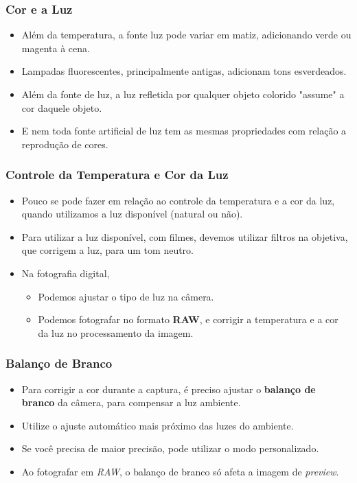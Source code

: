 
\begin{frame}
    \frametitle{Cor e a Luz}
    \begin{itemize}
      \item Além da temperatura, a fonte luz pode variar em matiz, adicionando verde ou magenta
      à cena.
      \item Lampadas fluorescentes, principalmente antigas, adicionam tons esverdeados.
      \item Além da fonte de luz, a luz refletida por qualquer objeto colorido "assume" a cor
      daquele objeto.
      \item E nem toda fonte artificial de luz tem as mesmas propriedades com relação a
      reprodução de cores.
    \end{itemize}
\end{frame}


\begin{frame}
    \frametitle{\Large{Controle da Temperatura e Cor da Luz}}
    \begin{itemize}
      \item Pouco se pode fazer em relação ao controle da temperatura e a cor da luz,
      quando utilizamos a luz disponível (natural ou não).
      \item Para utilizar a luz disponível, com filmes, devemos utilizar filtros
      na objetiva, que corrigem a luz, para um tom neutro.
      \item Na fotografia digital,
        \begin{itemize}
          \item Podemos ajustar o tipo de luz na câmera.
          \item Podemos fotografar no formato \textbf{RAW}, e
          corrigir a temperatura e a cor da luz no processamento da imagem.
        \end{itemize}
    \end{itemize}
\end{frame}

\begin{frame}
    \frametitle{Balanço de Branco}
    \begin{itemize}
      \item Para corrigir a cor durante a captura, é preciso ajustar o
      \textbf{balanço de branco} da câmera, para compensar a luz ambiente.
      \item Utilize o ajuste automático mais próximo das luzes do ambiente.
      \item Se você precisa de maior precisão, pode utilizar o modo personalizado.
      \item Ao fotografar em \textit{RAW}, o balanço de branco só afeta a imagem
      de \textit{preview}.
    \end{itemize}
\end{frame}

